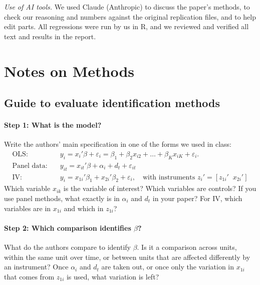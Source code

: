 \documentclass[12pt,a4paper]{article}
\newif\ifshowinstr
\newcommand{\instr}[1]{\ifshowinstr{\leavevmode\color{gray}\itshape\small [#1]\par}\fi}
\begin{document}
\textit{Use of AI tools.} We used Claude (Anthropic) to discuss the paper's methods, to check our reasoning and numbers against the original replication files, and to help edit parts. All regressions were run by us in R, and we reviewed and verified all text and results in the report.

\clearpage
\section{Notes on Methods}

\instr{Delete this appendix before submitting.}

\subsection{Guide to evaluate identification methods}


\paragraph{Step 1: What is the model?}
Write the authors' main specification in one of the forms we used in class:
\begin{align*}
  \text{OLS:} \quad & y_i = x_i'\beta + \varepsilon_i = \beta_1 + \beta_2 x_{i2} + \dots + \beta_K x_{iK} + \varepsilon_i . \\
  \text{Panel data:} \quad & y_{it} = x_{it}'\beta + \alpha_i + d_t + \varepsilon_{it} \\
  \text{IV:} \quad & y_i = x_{1i}'\beta_1 + x_{2i}'\beta_2 + \varepsilon_i,
     \quad \text{with instruments } z_i' = [z_{1i}' \;\; x_{2i}']
\end{align*}
Which variable $x_{ik}$ is the variable of interest? Which variables are controls? If you use panel methods, what exactly is in $\alpha_i$ and $d_t$ in your paper? For IV, which variables are in $x_{1i}$ and which in $z_{1i}$?
 
\paragraph{Step 2: Which comparison identifies $\beta$?}
What do the authors compare to identify $\beta$. Is it a comparison across units, within the same unit over time, or between units that are affected differently by an instrument? Once $\alpha_i$ and $d_t$ are taken out, or once only the variation in $x_{1i}$ that comes from $z_{1i}$ is used, what variation is left?
 
\end{document}

